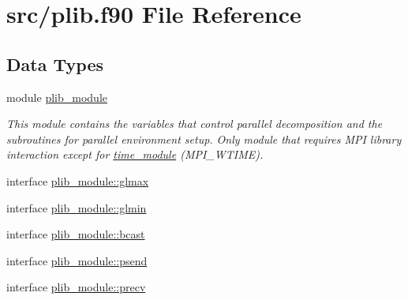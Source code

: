 \hypertarget{plib_8f90}{\section{src/plib.f90 File Reference}
\label{plib_8f90}
}
\subsection*{Data Types}
\begin{DoxyCompactItemize}
\item 
module \hyperlink{classplib__module}{plib\-\_\-module}
\begin{DoxyCompactList}\small\item\em This module contains the variables that control parallel decomposition and the subroutines for parallel environment setup. Only module that requires M\-P\-I library interaction except for \hyperlink{classtime__module}{time\-\_\-module} (M\-P\-I\-\_\-\-W\-T\-I\-M\-E). \end{DoxyCompactList}\item 
interface \hyperlink{interfaceplib__module_1_1glmax}{plib\-\_\-module\-::glmax}
\item 
interface \hyperlink{interfaceplib__module_1_1glmin}{plib\-\_\-module\-::glmin}
\item 
interface \hyperlink{interfaceplib__module_1_1bcast}{plib\-\_\-module\-::bcast}
\item 
interface \hyperlink{interfaceplib__module_1_1psend}{plib\-\_\-module\-::psend}
\item 
interface \hyperlink{interfaceplib__module_1_1precv}{plib\-\_\-module\-::precv}
\end{DoxyCompactItemize}
